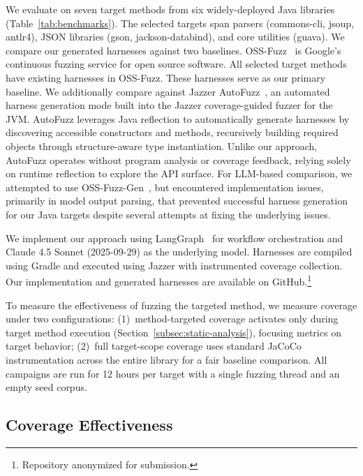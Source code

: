 We evaluate on seven target methods from six widely-deployed Java libraries (Table~\ref{tab:benchmarks}). The selected targets span parsers (commons-cli, jsoup, antlr4), JSON libraries (gson, jackson-databind), and core utilities (guava).
%
We compare our generated harnesses against two baselines. OSS-Fuzz~\cite{oss-fuzz} is Google's continuous fuzzing service for open source software. All selected target methods have existing harnesses in OSS-Fuzz. These harnesses serve as our primary baseline.
%
We additionally compare against Jazzer AutoFuzz~\cite{jazzer}, an automated harness generation mode built into the Jazzer coverage-guided fuzzer for the JVM. AutoFuzz leverages Java reflection to automatically generate harnesses by discovering accessible constructors and methods, recursively building required objects through structure-aware type instantiation. Unlike our approach, AutoFuzz operates without program analysis or coverage feedback, relying solely on runtime reflection to explore the API surface.
%
For LLM-based comparison, we attempted to use OSS-Fuzz-Gen~\cite{oss-fuzz-gen}, but encountered implementation issues, primarily in model output parsing, that prevented successful harness generation for our Java targets despite several attempts at fixing the underlying issues.
\par
We implement our approach using LangGraph~\cite{langgraph} for workflow orchestration and Claude 4.5 Sonnet (2025-09-29) as the underlying model. Harnesses are compiled using Gradle and executed using Jazzer with instrumented coverage collection. Our implementation and generated harnesses are available on GitHub.\footnote{Repository anonymized for submission.}
\par
To measure the effectiveness of fuzzing the targeted method, we measure coverage under two configurations: (1)~method-targeted coverage activates only during target method execution (Section~\ref{subsec:static-analysis}), focusing metrics on target behavior; (2)~full target-scope coverage uses standard JaCoCo instrumentation across the entire library for a fair baseline comparison.
All campaigns are run for 12 hours per target with a single fuzzing thread and an empty seed corpus.
\subsection{Coverage Effectiveness}
\label{subsec:coverage-effectiveness}




